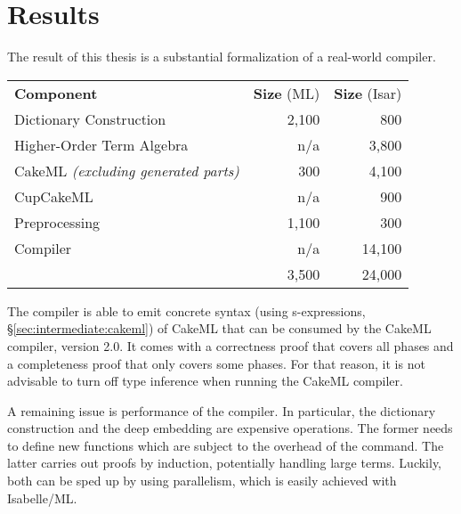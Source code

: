 
\section{Results}
\label{sec:conclusion:eval}

The result of this thesis is a substantial formalization of a real-world compiler.

\begin{center}
  \begin{tabular}{lrr}
    \textbf{Component} & \textbf{Size} (ML) & \textbf{Size} (Isar) \\
    Dictionary Construction & 2,100 & 800 \\
    Higher-Order Term Algebra & n/a & 3,800 \\
    CakeML {\small\itshape (excluding generated parts)} & 300 & 4,100 \\
    CupCakeML & n/a & 900 \\
    Preprocessing & 1,100 & 300 \\
    Compiler & n/a & 14,100 \\\hline
    & 3,500 & 24,000
  \end{tabular}
\end{center}

\noindent
The compiler is able to emit concrete syntax (using s-expressions, §\ref{sec:intermediate:cakeml}) of CakeML that can be consumed by the CakeML compiler, version 2.0.
It comes with a correctness proof that covers all phases and a completeness proof that only covers some phases.
For that reason, it is not advisable to turn off type inference when running the CakeML compiler.

A remaining issue is performance of the compiler.
In particular, the dictionary construction and the deep embedding are expensive operations.
The former needs to define new functions which are subject to the overhead of the  command.
The latter carries out proofs by induction, potentially handling large terms.
Luckily, both can be sped up by using parallelism, which is easily achieved with Isabelle/ML.